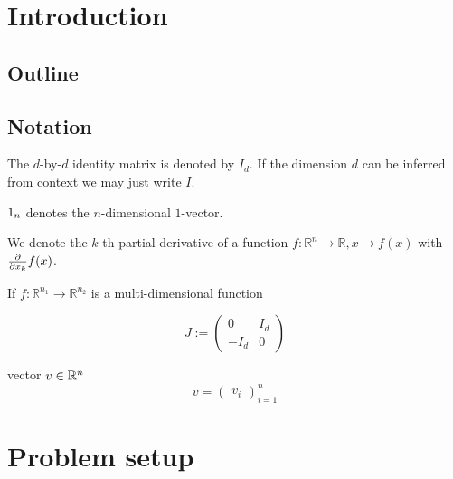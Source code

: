 \documentclass[twoside,a4paper]{article}
\begin{document}
\section{Introduction}

\subsection{Outline}

\subsection{Notation}

The $d$-by-$d$ identity matrix is denoted by $I_d$. If the dimension $d$ can be inferred
from context we may just write $I$.

$1_{n}$ denotes the $n$-dimensional $1$-vector.


We denote the $k$-th partial derivative of a function $f: \mathbb{R}^n \to \mathbb{R},
x \mapsto f(x)$ with $\frac{\partial }{\partial x_k} f(x)$.

If $f: \mathbb{R}^{n_1} \to \mathbb{R}^{n_2}$ is a multi-dimensional function




\begin{equation*}
	J := \begin{pmatrix}
		0 & I_d \\
		-I_d & 0
	\end{pmatrix}
\end{equation*}

vector $v \in \mathbb{R}^n$
\begin{equation*}
	v = \begin{pmatrix}
		v_i
	\end{pmatrix}_{i=1}^n
\end{equation*}


%
%
\newpage
\section{Problem setup}
\end{document}
